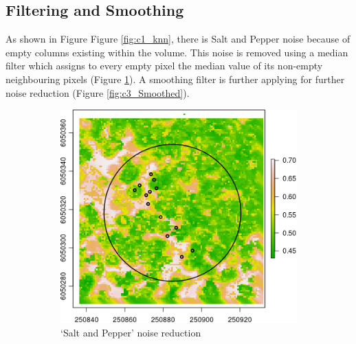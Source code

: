 \documentclass{subfiles}
\begin{document}
 
 
  \subsection{Filtering and Smoothing}\label{sec:filtering}
  As shown in Figure Figure \ref{fig:c1_knn}, there is Salt and Pepper noise because of empty columns existing within the volume. This noise is removed using a median filter which assigns to every empty pixel the median value of its non-empty neighbouring pixels  (Figure \ref{fig:c2_SaltPepper}). A smoothing filter is further applying for further noise reduction (Figure \ref{fig:c3_Smoothed}). 

	 \begin{figure} [h!]				   
	   \begin{subfigure}[t]{.49\textwidth}
	   \centering
	   \includegraphics[width=\textwidth]{img/dead/c2_knn_SaltPepper}
	   \caption{`Salt and Pepper' noise reduction} 
	   \label{fig:c2_SaltPepper}
	   \end{subfigure}
	   \begin{subfigure}[t]{.49\textwidth}
	   \centering

\end{subfigure}
\end{figure}
\end{document}
